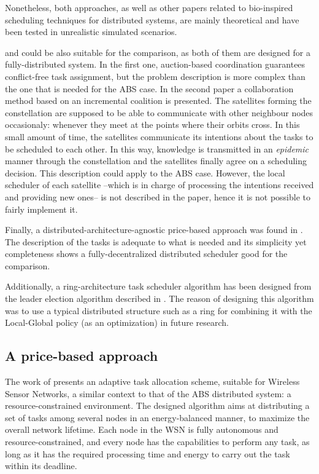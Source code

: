Nonetheless, both approaches, as well as other papers related to bio-inspired scheduling techniques for distributed systems, are mainly theoretical and have been tested in unrealistic simulated scenarios.

\cite{choi2009consensus} and \cite{bonnet2008coordination} could be also suitable for the comparison, as both of them are designed for a fully-distributed system. In the first one, auction-based coordination guarantees conflict-free task assignment, but the problem description is more complex than the one that is needed for the ABS case. In the second paper a collaboration method based on an incremental coalition is presented. The satellites forming the constellation are supposed to be able to communicate with other neighbour nodes occasionaly: whenever they meet at the points where their orbits cross. In this small amount of time, the satellites communicate its intentions about the tasks to be scheduled to each other. In this way, knowledge is transmitted in an \emph{epidemic} manner through the constellation and the satellites finally agree on a scheduling decision. This description could apply to the ABS case. However, the local scheduler of each satellite --which is in charge of processing the intentions received and providing new ones-- is not described in the paper, hence it is not possible to fairly implement it.

Finally, a distributed-architecture-agnostic price-based approach was found in \cite{Edalat09}. The description of the tasks is adequate to what is needed and its simplicity yet completeness shows a fully-decentralized distributed scheduler good for the comparison.

Additionally, a ring-architecture task scheduler algorithm has been designed from the leader election algorithm described in \cite[p.~266]{Tanenbaum:2006:DSP:1202502}. The reason of designing this algorithm was to use a typical distributed structure such as a ring for combining it with the Local-Global policy (as an optimization) in future research.

\subsection{A price-based approach}
\label{sec_MBdescription}

The work of \cite{Edalat09} presents an adaptive task allocation scheme, suitable for Wireless Sensor Networks, a similar context to that of the ABS distributed system: a resource-constrained environment. The designed algorithm aims at distributing a set of tasks among several nodes in an energy-balanced manner, to maximize the overall network lifetime. Each node in the WSN is fully autonomous and resource-constrained, and every node has the capabilities to perform any task, as long as it has the required processing time and energy to carry out the task within its deadline.

